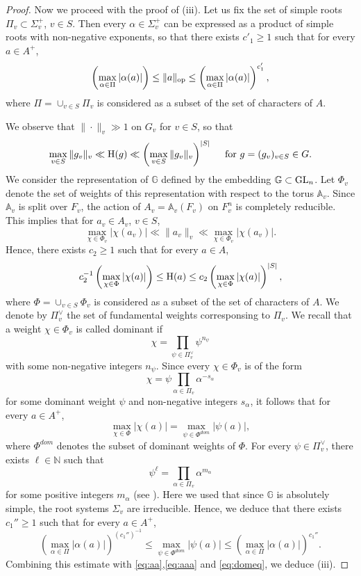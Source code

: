 \documentclass[11pt,reqno,a4paper]{amsart}
\numberwithin{equation}{section}
\newcommand{\bA}{\mathbb{A}}
\newcommand{\bG}{\mathbb{G}}
\theoremstyle{theorem}
\theoremstyle{definition}
\begin{document}
\begin{proof}
	Now we proceed with the proof of (iii).
	Let us fix the set of simple roots $\Pi_v\subset \Sigma^+_v$, $v\in S$.
	Then every $\alpha\in \Sigma_v^+$ can be expressed as a  product of simple roots
	with non-negative exponents, so that
	there exists $c'_1\ge 1$ such that for every $a\in A^+$,
	\begin{equation}
	\label{eq:aa}
	\left(\max_{\alpha\in \Pi} |\alpha(a)|\right)\le \|a\|_{\rm op}\le \left( \max_{\alpha\in \Pi} |\alpha(a)|\right)^{c_1'},
	\end{equation}
	where $\Pi=\cup_{v\in S}\Pi_v$ is considered as a subset of the set of characters of $A$.

	We observe that $\|\cdot\|_v\gg 1$ on $G_v$ for $v\in S$, so that 
	$$
	\max_{v\in S} \|g_v\|_v\ll \hbox{H}(g)\ll \left(\max_{v\in S} \|g_v\|_v\right)^{|S|}
	\quad \hbox{ for $g=(g_v)_{v\in S}\in G$.}
	$$
	We consider the representation of $\bG$ defined by
	the embedding $\bG \subset \hbox{GL}_n$. Let $\Phi_v$ denote the set of weights of this representation with respect to the torus $\bA_v$. Since $\bA_v$ is split over $F_v$,
	the action of $A_v=\bA_v(F_v)$ on $F_v^n$ is completely reducible.
	This implies that for $a_v\in A_v$, $v\in S$,
	$$
	\max_{\chi\in \Phi_v} |\chi(a_v)|\ll \|a_v\|_v\ll \max_{\chi\in \Phi_v} |\chi(a_v)|.
	$$
	Hence, there exists $c_2\ge 1$ such that for every $a\in A$,
	\begin{equation}
	\label{eq:aaa}
	c_2^{-1} \left(\max_{\chi\in \Phi} |\chi(a)|\right)\le \hbox{H}(a)\le c_2 \left(\max_{\chi\in \Phi} |\chi(a)|\right)^{|S|},
	\end{equation}
	where $\Phi=\cup_{v\in S} \Phi_v$ is considered as a subset of the set of characters of $A$.
	We denote by $\Pi_v^\vee$ the set of fundamental weights corresponsing to $\Pi_v$.
	We recall that a weight $\chi\in \Phi_v$ is called dominant if 
	$$
	\chi=\prod_{\psi\in \Pi_v^\vee} \psi^{n_\psi}
	$$
	with some non-negative integers $n_\psi$. Since every $\chi\in \Phi_v$ is of the form
	$$
	\chi=\psi \prod_{\alpha\in\Pi_v} \alpha^{-s_\alpha}
	$$
	for some dominant weight $\psi$ and non-negative integers $s_\alpha$, it follows that for every $a\in A^+$,
	\begin{equation}
	\label{eq:domeq}
	\max_{\chi\in \Phi} |\chi(a)|=\max_{\psi\in \Phi^{dom}} |\psi(a)|,
	\end{equation}
	where $\Phi^{dom}$ denotes the subset of dominant weights of $\Phi$. 
	For every $\psi\in \Pi_v^\vee$, there
	exists $\ell\in \mathbb{N}$ such that
	$$
	\psi^\ell=\prod_{\alpha\in \Pi_v} \alpha^{m_\alpha}
	$$
	for some positive integers $m_\alpha$ (see \cite[Ch. 3, \S1.9]{OV}).
	Here we used that since $\bG$ is absolutely simple, the root systems $\Sigma_v$ are irreducible.
	Hence, we deduce that there exists $c_1''\ge 1$ such that
	for every $a\in A^+$,
	$$
	\left( \max_{\alpha\in \Pi} |\alpha(a)|\right)^{(c_1'')^{-1}}\le \max_{\psi\in \Phi^{dom}} |\psi(a)|\le \left( \max_{\alpha\in \Pi} |\alpha(a)|\right)^{c_1''}.
	$$
	Combining this estimate with \eqref{eq:aa},\eqref{eq:aaa} and \eqref{eq:domeq}, we deduce (iii).
	

\end{proof}
\end{document}
